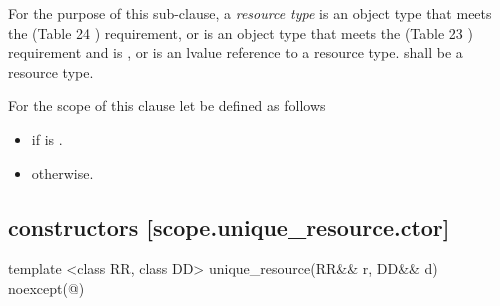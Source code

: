 \documentclass[ebook,11pt,article]{memoir}
\begin{document}
\pnum
For the purpose of this sub-clause, 
a \emph{resource type}  is an object type that meets the
 (Table 24
) requirement,  or 
is an object type that meets the  (Table 23
) requirement and
 is ,
or is an lvalue reference to a resource type.
 shall be a resource type.

\pnum
For the scope of this clause let  be defined as follows
\begin{itemize}
\item {} if  is .
\item {} otherwise.
\end{itemize}



\subsection { constructors [scope.unique_resource.ctor]}


\begin{itemdecl}
template <class RR, class DD>
unique_resource(RR&& r, DD&& d) noexcept(@\seebelow@)
\end{itemdecl}
\end{document}
